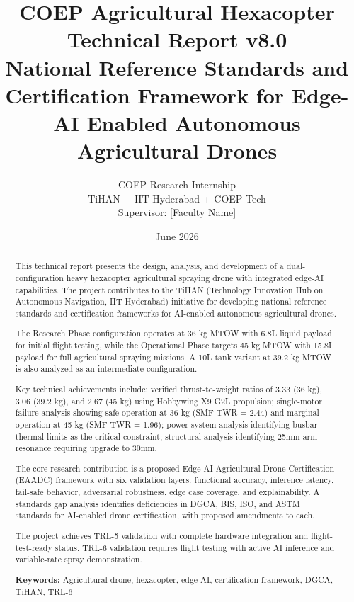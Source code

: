 \documentclass[12pt,a4paper]{article}
\title{\textbf{COEP Agricultural Hexacopter}\\Technical Report v8.0\\[0.5em]\large National Reference Standards and Certification Framework for Edge-AI Enabled Autonomous Agricultural Drones}
\author{COEP Research Internship\\TiHAN + IIT Hyderabad + COEP Tech\\[0.3em]\small Supervisor: [Faculty Name]}
\date{June 2026}
\begin{document}
\maketitle
\thispagestyle{empty}

\begin{abstract}
This technical report presents the design, analysis, and development of a dual-configuration heavy hexacopter agricultural spraying drone with integrated edge-AI capabilities. The project contributes to the TiHAN (Technology Innovation Hub on Autonomous Navigation, IIT Hyderabad) initiative for developing national reference standards and certification frameworks for AI-enabled autonomous agricultural drones.

The Research Phase configuration operates at 36 kg MTOW with 6.8L liquid payload for initial flight testing, while the Operational Phase targets 45 kg MTOW with 15.8L payload for full agricultural spraying missions. A 10L tank variant at 39.2 kg MTOW is also analyzed as an intermediate configuration.

Key technical achievements include: verified thrust-to-weight ratios of 3.33 (36 kg), 3.06 (39.2 kg), and 2.67 (45 kg) using Hobbywing X9 G2L propulsion; single-motor failure analysis showing safe operation at 36 kg (SMF TWR = 2.44) and marginal operation at 45 kg (SMF TWR = 1.96); power system analysis identifying busbar thermal limits as the critical constraint; structural analysis identifying 25mm arm resonance requiring upgrade to 30mm.

The core research contribution is a proposed Edge-AI Agricultural Drone Certification (EAADC) framework with six validation layers: functional accuracy, inference latency, fail-safe behavior, adversarial robustness, edge case coverage, and explainability. A standards gap analysis identifies deficiencies in DGCA, BIS, ISO, and ASTM standards for AI-enabled drone certification, with proposed amendments to each.

The project achieves TRL-5 validation with complete hardware integration and flight-test-ready status. TRL-6 validation requires flight testing with active AI inference and variable-rate spray demonstration.

\textbf{Keywords:} Agricultural drone, hexacopter, edge-AI, certification framework, DGCA, TiHAN, TRL-6
\end{abstract}

\newpage
\tableofcontents
\newpage

\end{document}

